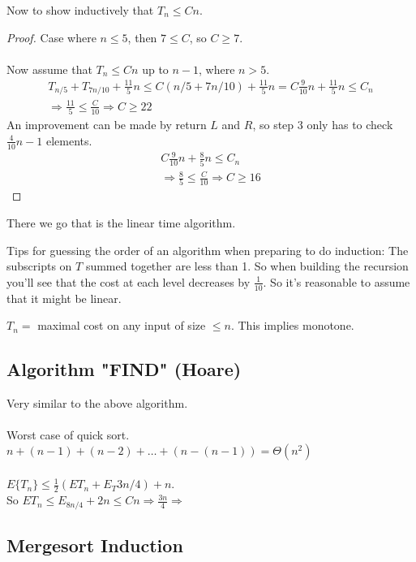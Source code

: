 \documentclass[class=scrartcl, crop=false]{standalone}
\begin{document}
Now to show inductively that $T_n \leq Cn$.
\begin{proof}
  Case where $n \leq 5$, then $7 \leq C$, so $C \geq 7$.
  \\\\
  Now assume that $T_n \leq Cn$ up to $n - 1$, where $n > 5$. 
  \begin{gather*}
    T_{n / 5} + T_{7n / 10} + \frac{11}{5}n \leq C(n / 5 + 7n / 10) + \frac{11}{5}n 
    = C\frac{9}{10}n + \frac{11}{5}n \leq C_n \\
    \Rightarrow \frac{11}{5} \leq \frac{C}{10} \Rightarrow C \geq 22
  \end{gather*} 
  An improvement can be made by return $L$ and $R$, so step 3 only has to check $\frac{4}{10}n - 1$ elements.
  \begin{gather*}
    C\frac{9}{10}n + \frac{8}{5}n \leq C_n \\
    \Rightarrow \frac{8}{5} \leq \frac{C}{10} \Rightarrow C \geq 16
  \end{gather*} 
\end{proof} 
There we go that is the linear time algorithm.

Tips for guessing the order of an algorithm when preparing to do induction: The subscripts on $T$ summed together are less than 1. So when building the recursion you'll see that the cost at each level decreases by $\frac{1}{10}$. So it's reasonable to assume that it might be linear.

\begin{note}
  $T_n =$ maximal cost on any input of size $\leq n$. This implies monotone.
\end{note} 

\subsection{Algorithm "FIND" (Hoare)}

Very similar to the above algorithm.
\\\\
Worst case of quick sort. $n + (n - 1) + (n - 2) + \dots + (n - (n - 1)) = \Theta(n^2)$ 
\\\\
$E\{T_n\} \leq \frac{1}{2}(ET_n + E_T{3n / 4}) + n$.
\\
So $ET_n \leq E_{8n / 4} + 2n \leq Cn \Rightarrow  \frac{3n}{4} \Rightarrow$ %

\subsection{Mergesort Induction}
\end{document}
